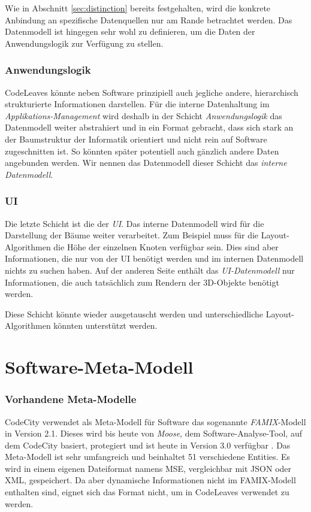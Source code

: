Wie in Abschnitt \ref{sec:distinction} bereits festgehalten, wird die konkrete Anbindung an spezifische Datenquellen nur am Rande betrachtet werden. Das Datenmodell ist hingegen sehr wohl zu definieren, um die Daten der Anwendungslogik zur Verfügung zu stellen.

\subsubsection*{Anwendungslogik}
CodeLeaves könnte neben Software prinzipiell auch jegliche andere, hierarchisch strukturierte Informationen darstellen. Für die interne Datenhaltung im \textit{Applikations-Management} wird deshalb in der Schicht \textit{Anwendungslogik} das Datenmodell weiter abstrahiert und in ein Format gebracht, dass sich stark an der Baumstruktur der Informatik orientiert und nicht rein auf Software zugeschnitten ist. So könnten später potentiell auch gänzlich andere Daten angebunden werden. Wir nennen das Datenmodell dieser Schicht das \textit{interne Datenmodell}.

\subsubsection*{UI}
Die letzte Schicht ist die der \textit{UI}. Das interne Datenmodell wird für die Darstellung der Bäume weiter verarbeitet. Zum Beispiel muss für die Layout-Algorithmen die Höhe der einzelnen Knoten verfügbar sein. Dies sind aber Informationen, die nur von der UI benötigt werden und im internen Datenmodell nichts zu suchen haben. Auf der anderen Seite enthält das \textit{UI-Datenmodell} nur Informationen, die auch tatsächlich zum Rendern der 3D-Objekte benötigt werden.

Diese Schicht könnte wieder ausgetauscht werden und unterschiedliche Layout-Algorithmen könnten unterstützt werden.

\section{Software-Meta-Modell}
\label{sec:software-model}

\subsubsection*{Vorhandene Meta-Modelle}

CodeCity verwendet als Meta-Modell für Software das sogenannte \textit{FAMIX}-Modell in Version 2.1. Dieses wird bis heute von \textit{Moose}, dem Software-Analyse-Tool, auf dem CodeCity basiert, protegiert und ist heute in Version 3.0 verfügbar \cite{merrill1916moose}. Das Meta-Modell ist sehr umfangreich und beinhaltet 51 verschiedene Entities. Es wird in einem eigenen Dateiformat namens MSE, vergleichbar mit JSON oder XML, gespeichert. Da aber dynamische Informationen nicht im FAMIX-Modell enthalten sind, eignet sich das Format nicht, um in CodeLeaves verwendet zu werden.

